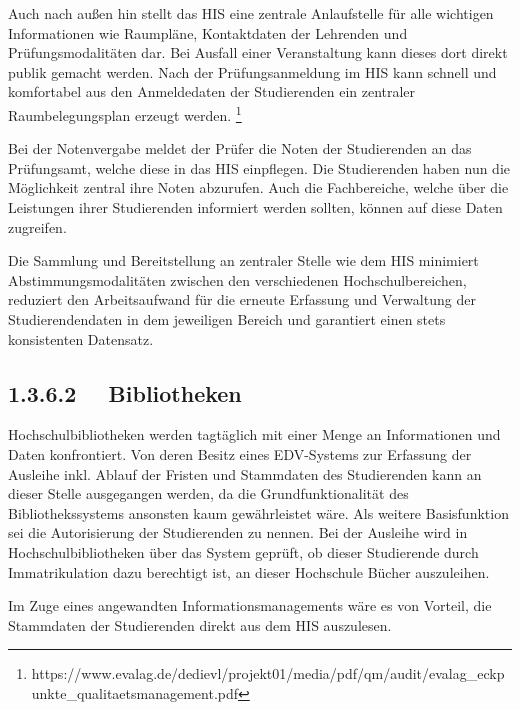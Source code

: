 \documentclass[a4paper]{article}
\begin{document}
\bigskip

{\sffamily\color{black}
Auch nach außen hin stellt das HIS eine zentrale Anlaufstelle für alle wichtigen Informationen wie Raumpläne,
Kontaktdaten der Lehrenden und Prüfungsmodalitäten dar. Bei Ausfall einer Veranstaltung kann dieses dort direkt publik
gemacht werden. Nach der Prüfungsanmeldung im HIS kann schnell und komfortabel aus den Anmeldedaten der Studierenden
ein zentraler Raumbelegungsplan erzeugt werden.
\footnote{https://www.evalag.de/dedievl/projekt01/media/pdf/qm/audit/evalag\_eckpunkte\_qualitaetsmanagement.pdf}\textrm{
}}


\bigskip

{\sffamily\color{black}
Bei der Notenvergabe meldet der Prüfer die Noten der Studierenden an das Prüfungsamt, welche diese in das HIS
einpflegen. Die Studierenden haben nun die Möglichkeit zentral ihre Noten abzurufen. Auch die Fachbereiche, welche über
die Leistungen ihrer Studierenden informiert werden sollten, können auf diese Daten zugreifen. }


\bigskip

{\sffamily\color{black}
Die Sammlung und Bereitstellung an zentraler Stelle wie dem HIS minimiert Abstimmungsmodalitäten zwischen den
verschiedenen Hochschulbereichen, reduziert den Arbeitsaufwand für die erneute Erfassung und Verwaltung der
Studierendendaten in dem jeweiligen Bereich und garantiert einen stets konsistenten Datensatz. }

\subsection[1.3.6.2 \ \ Bibliotheken]{\color{black} 1.3.6.2 \ \ Bibliotheken}
{\sffamily\color{black}
Hochschulbibliotheken werden tagtäglich mit einer Menge an Informationen und Daten konfrontiert. Von deren Besitz eines
EDV-Systems zur Erfassung der Ausleihe inkl. Ablauf der Fristen und Stammdaten des Studierenden kann an dieser Stelle
ausgegangen werden, da die Grundfunktionalität des Bibliothekssystems ansonsten kaum gewährleistet wäre. Als weitere
Basisfunktion sei die Autorisierung der Studierenden zu nennen. Bei der Ausleihe wird in Hochschulbibliotheken über das
System geprüft, ob dieser Studierende durch Immatrikulation dazu berechtigt ist, an dieser Hochschule Bücher
auszuleihen. }

{\sffamily\color{black}
Im Zuge eines angewandten Informationsmanagements wäre es von Vorteil, die Stammdaten der Studierenden direkt aus dem
HIS auszulesen. }
\end{document}
